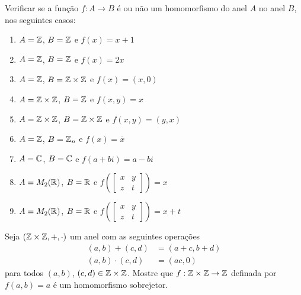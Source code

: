 \documentclass[12pt]{exam}
\begin{document}
     Verificar se a fun\c{c}\~ao $f : A \to B$ \'e ou n\~ao um homomorfismo do anel $A$ no anel $B$, nos seguintes casos:
    \begin{enumerate}[label=({\alph*})]
        \item $A = \mathbb{Z}$, $B = \mathbb{Z}$ e $f(x) = x + 1$

        \item $A = \mathbb{Z}$, $B = \mathbb{Z}$ e $f(x) = 2x$

        \item $A = \mathbb{Z}$, $B = \mathbb{Z} \times \mathbb{Z}$ e $f(x) = (x, 0)$

        \item $A = \mathbb{Z} \times \mathbb{Z}$, $B = \mathbb{Z}$ e $f(x,y) = x$

        \item $A = \mathbb{Z} \times \mathbb{Z}$, $B = \mathbb{Z} \times \mathbb{Z}$ e $f(x,y) = (y,x)$

        \item $A = \mathbb{Z}$, $B = \mathbb{Z}_n$ e $f(x) = \overline{x}$

        \item $A = \mathbb{C}$, $B = \mathbb{C}$ e $f(a + bi) = a - bi$

        \item $A = M_2(\mathbb{R})$, $B = \mathbb{R}$ e $f\left(\begin{bmatrix}
            x & y\\z & t
        \end{bmatrix}\right) = x$

        \item $A = M_2(\mathbb{R})$, $B = \mathbb{R}$ e $f\left(\begin{bmatrix}
            x & y\\z & t
        \end{bmatrix}\right) = x + t$
    \end{enumerate}

    \vspace{.3cm}

    \questao{} Seja $(\mathbb{Z}\times\mathbb{Z}, +, \cdot)$ um anel com as seguintes opera\c{c}\~oes
    \begin{align*}
        (a, b) + (c, d) &= (a + c, b + d)\\
        (a, b)\cdot (c, d) &= (ac, 0)
    \end{align*}
    para todos $(a, b)$, $(c, d) \in \mathbb{Z}\times\mathbb{Z}$.
    Mostre que $ f : \mathbb{Z}\times\mathbb{Z} \to \mathbb{Z}$ definada por $f(a, b) = a$ \'e um homomorfismo sobrejetor.

    \vspace{.3cm}
\end{document}
